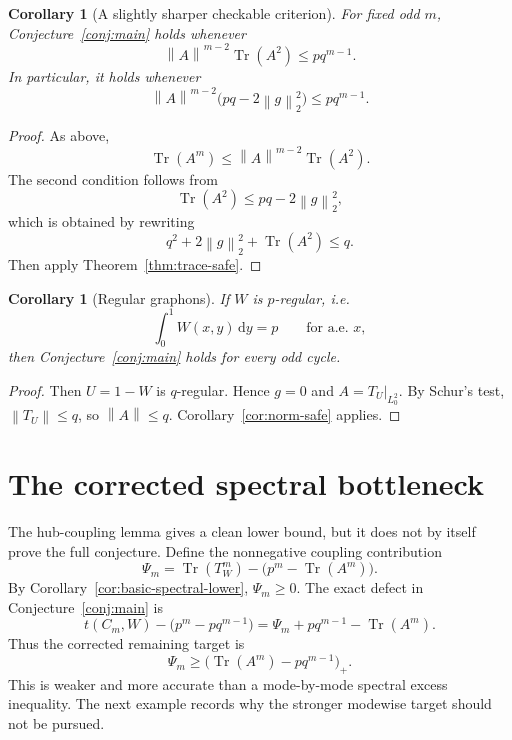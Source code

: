 \documentclass[11pt]{article}
\newtheorem{corollary}[theorem]{Corollary}
\theoremstyle{definition}
\theoremstyle{remark}
\newcommand{\Tr}{\operatorname{Tr}}
\newcommand{\norm}[1]{\left\lVert #1\right\rVert}
\newcommand{\dd}{\,\mathrm d}
\newcommand{\0}{\mathbf 0}
\begin{document}
\begin{corollary}[A slightly sharper checkable criterion]\label{cor:sharp-checkable}
For fixed odd $m$, Conjecture~\ref{conj:main} holds whenever
\[
        \norm A^{m-2}\Tr(A^2)\le p q^{m-1}.
\]
In particular, it holds whenever
\[
        \norm A^{m-2}\bigl(pq-2\norm g_2^2\bigr)\le p q^{m-1}.
\]
\end{corollary}

\begin{proof}
As above,
\[
        \Tr(A^m)\le \norm A^{m-2}\Tr(A^2).
\]
The second condition follows from
\[
        \Tr(A^2)\le pq-2\norm g_2^2,
\]
which is obtained by rewriting
\[
        q^2+2\norm g_2^2+\Tr(A^2)\le q.
\]
Then apply Theorem~\ref{thm:trace-safe}.
\end{proof}

\begin{corollary}[Regular graphons]\label{cor:regular}
If $W$ is $p$-regular, i.e.
\[
        \int_0^1 W(x,y)\dd y=p
        \qquad\text{for a.e. }x,
\]
then Conjecture~\ref{conj:main} holds for every odd cycle.
\end{corollary}

\begin{proof}
Then $U=1-W$ is $q$-regular.  Hence $g=0$ and $A=T_U|_{L^2_0}$.  By Schur's test, $\norm{T_U}\le q$, so $\norm A\le q$.  Corollary~\ref{cor:norm-safe} applies.
\end{proof}

\section{The corrected spectral bottleneck}

The hub-coupling lemma gives a clean lower bound, but it does not by itself prove the full conjecture.  Define the nonnegative coupling contribution
\begin{equation}\label{eq:Psi-def}
        \Psi_m
        =
        \Tr(T_W^m)-\bigl(p^m-\Tr(A^m)\bigr).
\end{equation}
By Corollary~\ref{cor:basic-spectral-lower}, $\Psi_m\ge0$.  The exact defect in Conjecture~\ref{conj:main} is
\begin{equation}\label{eq:corrected-defect}
        t(C_m,W)-\bigl(p^m-pq^{m-1}\bigr)
        =
        \Psi_m+pq^{m-1}-\Tr(A^m).
\end{equation}
Thus the corrected remaining target is
\begin{equation}\label{eq:corrected-target}
        \Psi_m\ge \bigl(\Tr(A^m)-pq^{m-1}\bigr)_+.
\end{equation}
This is weaker and more accurate than a mode-by-mode spectral excess inequality.  The next example records why the stronger modewise target should not be pursued.
\end{document}
